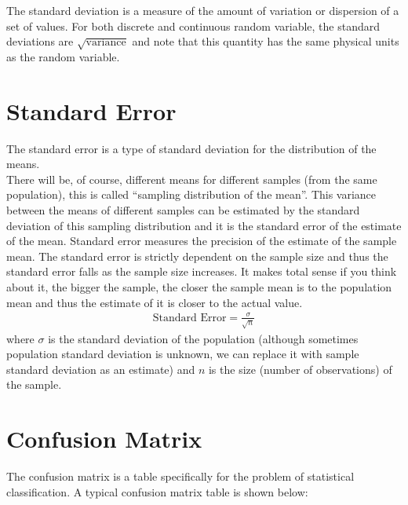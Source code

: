 The standard deviation is a measure of the amount of variation or dispersion of a set of values. For both discrete and continuous random variable, the standard deviations are $\sqrt{\text{variance}}$ and note that this quantity has the same physical units as the random variable. \\

\section{Standard Error}

The standard error is a type of standard deviation for the distribution of the means. \\

There will be, of course, different means for different samples (from the same population), this is called “sampling distribution of the mean”. This variance between the means of different samples can be estimated by the standard deviation of this sampling distribution and it is the standard error of the estimate of the mean. Standard error measures the precision of the estimate of the sample mean. The standard error is strictly dependent on the sample size and thus the standard error falls as the sample size increases. It makes total sense if you think about it, the bigger the sample, the closer the sample mean is to the population mean and thus the estimate of it is closer to the actual value.
\begin{eqnarray}
\text{Standard Error} = \frac{\sigma}{\sqrt{n}}
\label{se}
\end{eqnarray}
where $\sigma$ is the standard deviation of the population (although sometimes population standard deviation is unknown, we can replace it with sample standard deviation as an estimate) and $n$ is the size (number of observations) of the sample.

\section{Confusion Matrix}

The confusion matrix is a table specifically for the problem of statistical classification. A typical confusion matrix table is shown below:

